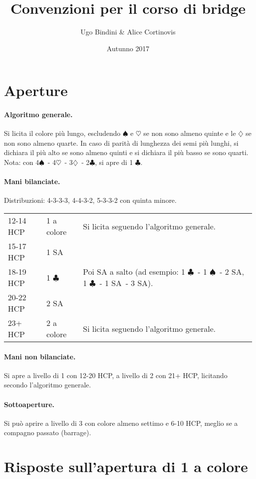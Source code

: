 \documentclass[a4paper,10pt]{article}
\title{Convenzioni per il corso di bridge}
\author{Ugo Bindini \& Alice Cortinovis}
\date{Autunno 2017}
\renewcommand{\c}{$\clubsuit$\xspace}
\renewcommand{\d}{$\diamondsuit$\xspace}
\newcommand{\h}{$\heartsuit$\xspace}
\newcommand{\s}{$\spadesuit$\xspace}
\newcommand{\sa}{SA\xspace}
\newcommand{\smallspace}{\vskip0.3cm}
\newenvironment{threecol}
  {\smallspace\noindent\begin{tabular}{l l p{0.78\textwidth}}}
  {\end{tabular}\smallspace}
\begin{document}
\maketitle

\section{Aperture}

\paragraph{Algoritmo generale.}
Si licita il colore più lungo, escludendo \s e \h se non sono almeno quinte e le \d se non sono almeno quarte.
In caso di parità di lunghezza dei semi più lunghi, si dichiara il più alto se sono almeno quinti e si dichiara il più basso se sono quarti.
Nota: con 4\s\ - 4\h\ - 3\d\ - 2\c, si apre di 1 \c.

\paragraph{Mani bilanciate.} Distribuzioni: 4-3-3-3, 4-4-3-2, 5-3-3-2 con quinta minore.

\begin{threecol}
 12-14 HCP & 1 a colore & Si licita seguendo l'algoritmo generale.\\
 15-17 HCP & 1 \sa\\
 18-19 HCP & 1 \c & Poi \sa a salto (ad esempio: 1 \c\ - 1 \s\ - 2 \sa, 1 \c\ - 1 \sa\ - 3 \sa).\\
 20-22 HCP & 2 \sa\\
 23+ HCP & 2 a colore & Si licita seguendo l'algoritmo generale.
\end{threecol}

\paragraph{Mani non bilanciate.} Si apre a livello di 1 con 12-20 HCP, a livello di 2 con 21+ HCP, licitando secondo l'algoritmo generale.

\paragraph{Sottoaperture.} Si può aprire a livello di 3 con colore almeno settimo e 6-10 HCP, meglio se a compagno passato (barrage).


\section{Risposte sull'apertura di 1 a colore}
\end{document}
